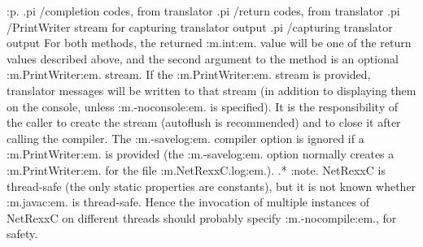 :p.
.pi /completion codes, from translator
.pi /return codes, from translator
.pi /PrintWriter stream for capturing translator output
.pi /capturing translator output
For both methods, the returned :m.int:em. value will be one of the
return values described above, and the second argument to the method is
an optional :m.PrintWriter:em. stream.  If the :m.PrintWriter:em. stream
is provided, translator messages will be written to that stream (in
addition to displaying them on the console, unless :m.-noconsole:em. is
specified).
It is the responsibility of the caller to create the stream (autoflush
is recommended) and to close it after calling the compiler.
The :m.-savelog:em. compiler option is ignored if a :m.PrintWriter:em.
is provided (the :m.-savelog:em. option normally creates
a :m.PrintWriter:em. for the file :m.NetRexxC.log:em.).
.*
:note.
NetRexxC is thread-safe (the only static properties are constants), but
it is not known whether :m.javac:em. is thread-safe.  Hence the
invocation of multiple instances of NetRexxC on different threads should
probably specify :m.-nocompile:em., for safety.
